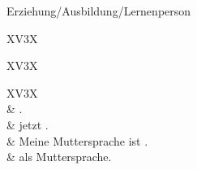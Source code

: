 \begin{discourse}{Erziehung/Ausbildung/Lernen}{person}
\begin{tabularx}{\linewidth}{XV{3}X}
	 \\
	\bline
\end{tabularx}

\begin{tabularx}{\linewidth}{XV{3}X}
	 \\
	\bline
\end{tabularx}

\begin{tabularx}{\linewidth}{XV{3}X}
	 \\
	\bline
														   & \sbj {}  . \\
	 & \sbj {} jetzt  . \\
\ro												  & Meine Muttersprache ist \kontext{Sprache} . \\
\ro	{} & \sbj {}  als Muttersprache. \\
\end{tabularx}
\end{discourse}
